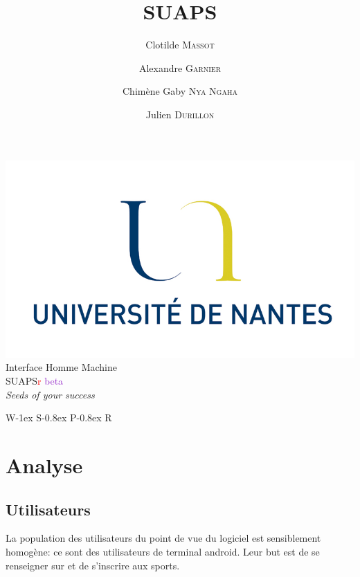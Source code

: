 \documentclass[french, titlepage, 11pt, a4paper]{article}
\title{SUAPS}
\author{Clotilde \textsc{Massot} \and Alexandre \textsc{Garnier} \and Chimène Gaby \textsc{Nya Ngaha} \and Julien \textsc{Durillon}}
\begin{document}
\begin{titlepage}

\begin{center}
    \includegraphics[]{./logofac.png}\\[2cm]

    {\Large Interface Homme Machine}\\[2cm]

    {\Huge SUAPS\textcolor{red}{r} \textcolor{DarkOrchid}{beta}}\\[0.5cm]
    {\large \emph{Seeds of your success}}
\end{center}



\end{titlepage}


\fontsize{48}{48}
{W}\kern-1ex
{S}\kern-0.8ex
{P}\kern-0.8ex
{R}



\section{Analyse}
\label{sec:analyse}

	\subsection{Utilisateurs}
		La population des utilisateurs du point de vue du logiciel est
		sensiblement homogène: ce sont des utilisateurs de terminal android.
		Leur but est de se renseigner sur et de s'inscrire aux sports.
\end{document}
